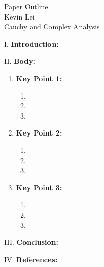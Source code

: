 \documentclass[11pt]{article}
\begin{document}
\begin{center}
    Paper Outline \\
    Kevin Lei \\
    Cauchy and Complex Analysis
\end{center}
\noindent I. \textbf{Introduction: } 

\noindent II. \textbf{Body: } 

\begin{enumerate}[label=\Alph*.]
    \item \textbf{Key Point 1: }
    \begin{enumerate}[label=\arabic*.]
        \item 
        \item 
        \item
    \end{enumerate}
    \item \textbf{Key Point 2: } 
    \begin{enumerate}[label=\arabic*.]
        \item 
        \item 
        \item
    \end{enumerate}
    \item \textbf{Key Point 3: }
    \begin{enumerate}[label=\arabic*.]
        \item 
        \item 
        \item
    \end{enumerate}
\end{enumerate}

\noindent III. \textbf{Conclusion: } 

\noindent IV. \textbf{References: } 
\end{document}
